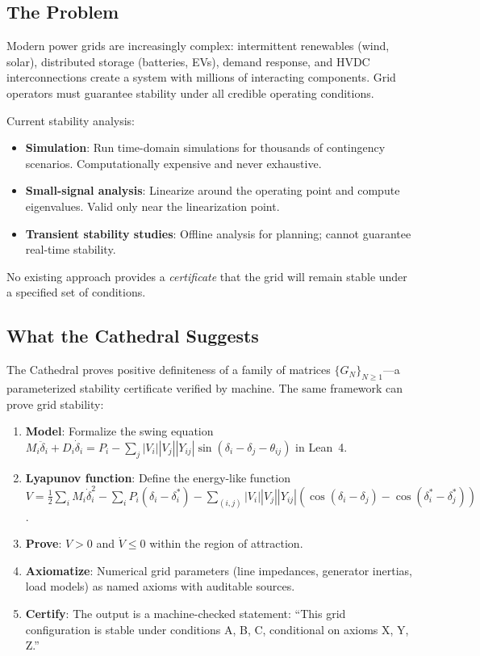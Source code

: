 \documentclass[11pt,a4paper]{article}
\begin{document}
\subsection{The Problem}

Modern power grids are increasingly complex: intermittent renewables
(wind, solar), distributed storage (batteries, EVs), demand
response, and HVDC interconnections create a system with millions of
interacting components. Grid operators must guarantee stability
under all credible operating conditions.

Current stability analysis:
\begin{itemize}
  \item \textbf{Simulation}: Run time-domain simulations for
    thousands of contingency scenarios. Computationally expensive
    and never exhaustive.
  \item \textbf{Small-signal analysis}: Linearize around the
    operating point and compute eigenvalues. Valid only near the
    linearization point.
  \item \textbf{Transient stability studies}: Offline analysis for
    planning; cannot guarantee real-time stability.
\end{itemize}

No existing approach provides a \emph{certificate} that the grid
will remain stable under a specified set of conditions.

\subsection{What the Cathedral Suggests}

The Cathedral proves positive definiteness of a family of matrices
$\{G_N\}_{N \geq 1}$---a parameterized stability certificate
verified by machine. The same framework can prove grid stability:

\begin{enumerate}
  \item \textbf{Model}: Formalize the swing equation
    $M_i \ddot{\delta}_i + D_i \dot{\delta}_i = P_i - \sum_j
    |V_i||V_j||Y_{ij}|\sin(\delta_i - \delta_j - \theta_{ij})$
    in Lean~4.
  \item \textbf{Lyapunov function}: Define the energy-like function
    $V = \frac{1}{2}\sum_i M_i \dot{\delta}_i^2 - \sum_i P_i
    (\delta_i - \delta_i^*) - \sum_{(i,j)} |V_i||V_j||Y_{ij}|
    (\cos(\delta_i - \delta_j) - \cos(\delta_i^* - \delta_j^*))$.
  \item \textbf{Prove}: $V > 0$ and $\dot{V} \leq 0$ within the
    region of attraction.
  \item \textbf{Axiomatize}: Numerical grid parameters (line
    impedances, generator inertias, load models) as named axioms
    with auditable sources.
  \item \textbf{Certify}: The output is a machine-checked statement:
    ``This grid configuration is stable under conditions A, B, C,
    conditional on axioms X, Y, Z.''
\end{enumerate}
\end{document}
